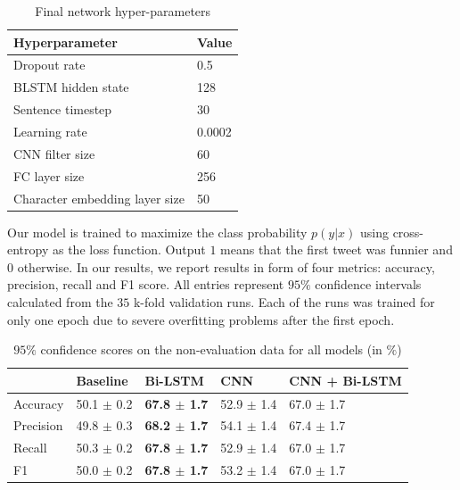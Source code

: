 \documentclass[10pt, a4paper]{article}
\begin{document}
\begin{table}
\small
\caption{Final network hyper-parameters}
 \label{tab:hyperparams}
 \begin{center}
 \begin{tabular}{ll}
 \toprule
     Hyperparameter & Value\\
 \midrule
     Dropout rate & 0.5\\
     BLSTM hidden state & 128\\
     Sentence timestep & 30\\
     Learning rate & 0.0002\\
     CNN filter size & 60 \\
     FC layer size & 256\\
     Character embedding layer size & 50\\
 \bottomrule
 \end{tabular}
 \end{center}
\end{table}

Our model is trained to maximize the class probability $p(y \vert x)$ using
cross-entropy as the loss function. Output $1$ means that the first tweet was
funnier and $0$ otherwise. 
In our results, we report results in form of
four metrics: accuracy, precision, recall and F1 score. All entries represent
$95\%$ confidence intervals calculated from the $35$ k-fold validation runs.
Each of the runs was trained for only one epoch due to severe overfitting
problems after the first epoch.

\begin{table}
\scriptsize
    \caption{$95\%$ confidence scores on the non-evaluation data for all models
    (in $\%$)}
 \label{tab:conf_95_dev}
 \begin{center}
 \begin{tabular}{l|llll}
 \toprule
     & Baseline & Bi-LSTM & CNN & CNN + Bi-LSTM\\
 \midrule
     Accuracy & 50.1 $\pm$ 0.2 & \textbf{67.8 $\pm$ 1.7} & 52.9 $\pm$ 1.4  & 67.0 $\pm$
     1.7\\

     Precision & 49.8 $\pm$ 0.3 & \textbf{68.2 $\pm$ 1.7}  & 54.1 $\pm$ 1.4& 67.4 $\pm$ 1.7\\
     Recall & 50.3 $\pm$ 0.2 & \textbf{67.8 $\pm$ 1.7} & 52.9 $\pm$ 1.4& 67.0 $\pm$ 1.7\\

     F1 & 50.0 $\pm$ 0.2 & \textbf{67.8 $\pm$ 1.7}  & 53.2 $\pm$ 1.4 & 67.0 $\pm$ 1.7\\

 \bottomrule
 \end{tabular}
 \end{center}
\end{table}
\end{document}
